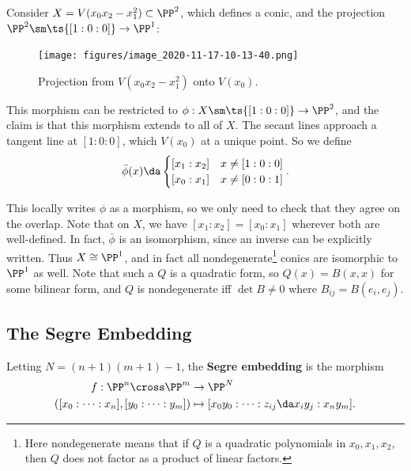 \begin{example}[?]

Consider \(X = V(x_0 x_2 - x_1^2) \subset \PP^2\), which defines a
conic, and the projection \(\PP^2 \sm \ts{[1:0:0]} \to \PP^1\):

\begin{figure}
\centering
\texttt{[image: figures/image\_2020-11-17-10-13-40.png]}
\caption{Projection from \(V(x_0 x_2 - x_1^2)\) onto \(V(x_0)\).}
\end{figure}

This morphism can be restricted to \(\phi: X\sm\ts{[1:0:0]} \to \PP^2\),
and the claim is that this morphism extends to all of \(X\). The secant
lines approach a tangent line at \([1:0:0]\), which \(V(x_0)\) at a
unique point. So we define
\begin{align*}  
\bar \phi(x) \da 
\begin{cases}
[x_1: x_2] & x \neq [1:0:0] \\
[x_0: x_1] & x \neq [0:0:1]
\end{cases}
.\end{align*}

This locally writes \(\phi\) as a morphism, so we only need to check
that they agree on the overlap. Note that on \(X\), we have
\([x_1: x_2] = [x_0 : x_1]\) wherever both are well-defined. In fact,
\(\bar \phi\) is an isomorphism, since an inverse can be explicitly
written. Thus \(X\cong \PP^1\), and in fact all nondegenerate\footnote{Here
  nondegenerate means that if \(Q\) is a quadratic polynomials in
  \(x_0, x_1, x_2\), then \(Q\) does not factor as a product of linear
  factors.} conics are isomorphic to \(\PP^1\) as well. Note that such a
\(Q\) is a quadratic form, so \(Q(x) = B(x, x)\) for some bilinear form,
and \(Q\) is nondegenerate iff \(\det B \neq 0\) where
\(B_{ij} = B(e_i, e_j)\).

\end{example}

\hypertarget{the-segre-embedding}{%
\subsection{The Segre Embedding}\label{the-segre-embedding}}

\begin{definition}

Letting \(N = (n+1)(m+1) - 1\), the \textbf{Segre embedding} is the
morphism
\begin{align*}  
f: \PP^n \cross \PP^m &\to \PP^N \\
([x_0: \cdots : x_n], [y_0: \cdots : y_m]) &\mapsto
[x_0 y_0 : \cdots : z_{ij} \da x_i y_j : x_n y_m]
.\end{align*}

\end{definition}

